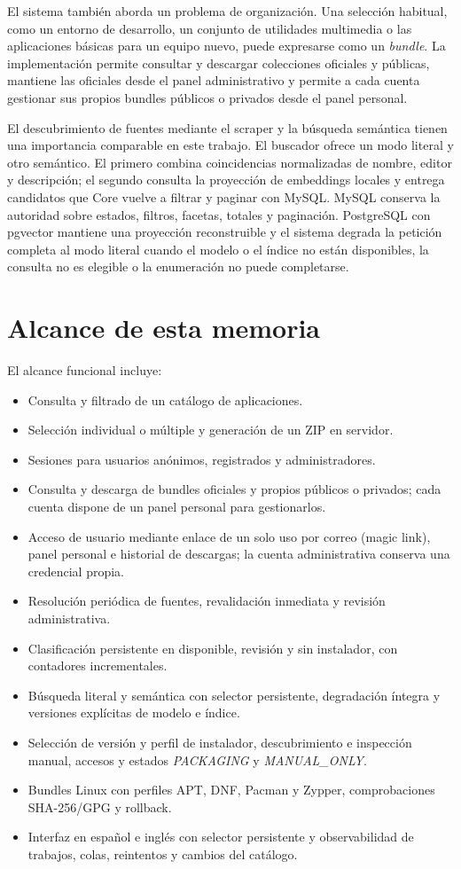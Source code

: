 El sistema también aborda un problema de organización. Una selección habitual, como un entorno de desarrollo, un conjunto de utilidades multimedia o las aplicaciones básicas para un equipo nuevo, puede expresarse como un \emph{bundle}. La implementación permite consultar y descargar colecciones oficiales y públicas, mantiene las oficiales desde el panel administrativo y permite a cada cuenta gestionar sus propios bundles públicos o privados desde el panel personal.

El descubrimiento de fuentes mediante el scraper y la búsqueda semántica tienen una importancia comparable en este trabajo. El buscador ofrece un modo literal y otro semántico. El primero combina coincidencias normalizadas de nombre, editor y descripción; el segundo consulta la proyección de embeddings locales y entrega candidatos que Core vuelve a filtrar y paginar con MySQL. MySQL conserva la autoridad sobre estados, filtros, facetas, totales y paginación. PostgreSQL con pgvector mantiene una proyección reconstruible y el sistema degrada la petición completa al modo literal cuando el modelo o el índice no están disponibles, la consulta no es elegible o la enumeración no puede completarse.

\section{Alcance de esta memoria}

El alcance funcional incluye:

\begin{itemize}
	\item Consulta y filtrado de un catálogo de aplicaciones.
	\item Selección individual o múltiple y generación de un ZIP en servidor.
	\item Sesiones para usuarios anónimos, registrados y administradores.
	\item Consulta y descarga de bundles oficiales y propios públicos o privados; cada cuenta dispone de un panel personal para gestionarlos.
	\item Acceso de usuario mediante enlace de un solo uso por correo (magic link), panel personal e historial de descargas; la cuenta administrativa conserva una credencial propia.
	\item Resolución periódica de fuentes, revalidación inmediata y revisión administrativa.
	\item Clasificación persistente en disponible, revisión y sin instalador, con contadores incrementales.
	\item Búsqueda literal y semántica con selector persistente, degradación íntegra y versiones explícitas de modelo e índice.
	\item Selección de versión y perfil de instalador, descubrimiento e inspección manual, accesos  y estados \emph{PACKAGING} y \emph{MANUAL\_ONLY}.
	\item Bundles Linux con perfiles APT, DNF, Pacman y Zypper, comprobaciones SHA-256/GPG y rollback.
	\item Interfaz en español e inglés con selector persistente y observabilidad de trabajos, colas, reintentos y cambios del catálogo.
\end{itemize}

